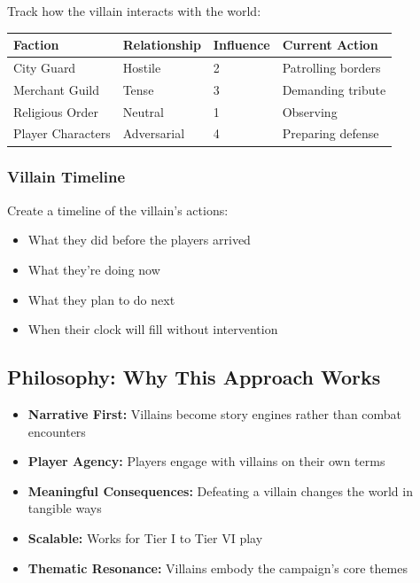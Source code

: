 Track how the villain interacts with the world:

\begin{center}
\begin{tabular}{|p{}|p{}|p{}|p{}|}
\hline
\textbf{Faction} & \textbf{Relationship} & \textbf{Influence} & \textbf{Current Action} \\ \hline
City Guard & Hostile & 2 & Patrolling borders \\ \hline
Merchant Guild & Tense & 3 & Demanding tribute \\ \hline
Religious Order & Neutral & 1 & Observing \\ \hline
Player Characters & Adversarial & 4 & Preparing defense \\ \hline
\end{tabular}
\end{center}

\subsubsection{Villain Timeline}

Create a timeline of the villain's actions:
\begin{itemize}
  \item What they did before the players arrived
  \item What they're doing now
  \item What they plan to do next
  \item When their clock will fill without intervention
\end{itemize}

\subsection{Philosophy: Why This Approach Works}

\begin{itemize}
  \item \textbf{Narrative First:} Villains become story engines rather than combat encounters
  \item \textbf{Player Agency:} Players engage with villains on their own terms
  \item \textbf{Meaningful Consequences:} Defeating a villain changes the world in tangible ways
  \item \textbf{Scalable:} Works for Tier I to Tier VI play
  \item \textbf{Thematic Resonance:} Villains embody the campaign's core themes
\end{itemize}

